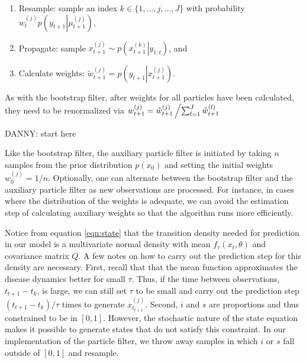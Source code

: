 \documentclass{article}
\newcommand{\danny}[1]{{\color{blue}DANNY: #1}}
\begin{document}
\begin{enumerate}
\item Resample: sample an index $k\in \{1,\ldots,j,\ldots,J\}$ with probability $w_t^{(j)}p\left(y_{t+1}\left|\mu_{t+1}^{(j)}\right.\right)$,
\item Propagate: sample $x_{t+1}^{(j)} \sim p\left(\left. x_{t+1}^{(k)}\right|y_{1:t}\right)$, and
\item Calculate weights: $\tilde{w}_{t+1}^{(j)} = p\left(y_{t+1}\left|x_{t+1}^{(j)}\right.\right)$.
\end{enumerate}

\noindent As with the bootstrap filter, after weights for all particles have been calculated, they need to be renormalized via $w_{t+1}^{(j)} = \tilde{w}_{t+1}^{(j)}\left/ \sum_{l=1}^J \tilde{w}_{t+1}^{(l)} \right.$

\danny{start here}

\noindent Like the bootstrap filter, the auxiliary particle filter is initiated by taking $n$ samples from the prior distribution $p(x_0)$ and setting the initial weights $w_0^{(j)} = 1/n$.  Optionally, one can alternate between the bootstrap filter and the auxiliary particle filter as new observations are processed.  For instance, in cases where the distribution of the weights is adequate, we can avoid the estimation step of calculating auxiliary weights so that the algorithm runs more efficiently.

Notice from equation \eqref{eqn:state} that the transition density needed for prediction in our model is a multivariate normal density with mean $f_\tau(x_t,\theta)$ and covariance matrix $Q$.  A few notes on how to carry out the prediction step for this density are necessary. First, recall that that the mean function approximates the disease dynamics better for small $\tau$.  Thus, if the time between observations, $t_{t+1} - t_k$, is large, we can still set $\tau$ to be small and carry out the prediction step $(t_{t+1} - t_k) / \tau$ times to generate $x_{t_{t+1}}^{(j)}$.  Second, $i$ and $s$ are proportions and thus constrained to be in $[0,1]$.  However, the stochastic nature of the state equation makes it possible to generate states that do not satisfy this constraint.  In our implementation of the particle filter, we throw away samples in which $i$ or $s$ fall outside of $[0,1]$ and resample.
\end{document}
